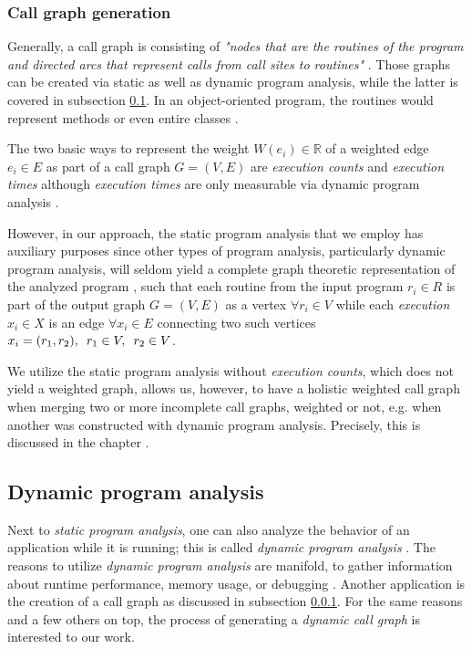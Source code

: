 \documentclass[12pt,a4paper]{report}
\begin{document}
\subsubsection{Call graph generation} \label{subsubsect:call-graph-static}
Generally, a call graph is consisting of \textit{"nodes that are the routines
of the program and directed arcs that represent calls from call sites to
routines"} \cite{graham1982gprof}. Those graphs can be created via static as
well as dynamic program analysis, while the latter is covered in subsection
\ref{subsect:background-dynamic-analysis}. In an object-oriented program, the
routines would represent methods or even entire classes \cite{
grove1997callgraph}.

The two basic ways to represent the weight \(W(e_i) \in \mathbb{R}\) of a
weighted edge \(e_i \in E\) as part of a call graph \(G = (V, E)\) are
\textit{execution counts} and \textit{execution times} although
\textit{execution times} are only measurable via dynamic program analysis
\cite{graham1982gprof}.

However, in our approach, the static program analysis that we employ has
auxiliary purposes since other types of program analysis, particularly dynamic
program analysis, will seldom yield a complete graph theoretic representation
of the analyzed program \cite{graham1982gprof}, such that each routine from the
input program \(r_i \in R\) is part of the output graph \(G = (V, E)\) as a
vertex \(\forall r_i \in V\) while each \textit{execution} \(x_i \in X\) is an
edge \(\forall x_i \in E\) connecting two such vertices \(x_i = (r_1, r_2),
\enskip r_1 \in V, \enskip r_2 \in V\).

We utilize the static program analysis without \textit{execution counts}, which
does not yield a weighted graph, allows us, however, to have a holistic
weighted call graph when merging two or more incomplete call graphs, weighted
or not, e.g. when another was constructed with dynamic program analysis.
Precisely, this is discussed in the chapter \textit{}.


\subsection{Dynamic program analysis} \label{subsect:background-dynamic-analysis}

Next to \textit{static program analysis}, one can also analyze the behavior of
an application while it is running; this is called \textit{dynamic program
analysis} \cite{ernst2003static}. The reasons to utilize \textit{dynamic
program analysis} are manifold, to gather information about runtime
performance, memory usage, or debugging \cite{ernst2003static}. Another
application is the creation of a call graph as discussed in subsection
\ref{subsubsect:call-graph-static}. For the same reasons and a few others on top,
the process of generating a \textit{dynamic call graph} is interested to our work.
\end{document}
